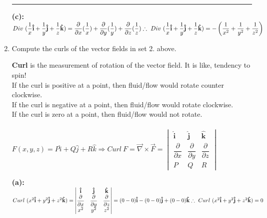 \documentclass[fleqn]{article}
\begin{document}
\begin{enumerate}
      \rule{15cm}{1pt}

      \textcolor{hwColor}{
        \textbf{(c):} \\
        $
          Div ~ (\dfrac{1}{x} \mathbf{\hat{i}}+\dfrac{1}{y} \mathbf{\hat{j}}+\dfrac{1}{z} \mathbf{\hat{k}})=\dfrac{\partial}{\partial x}(\dfrac{1}{x})+\dfrac{\partial}{\partial y}(\dfrac{1}{y})+\dfrac{\partial}{\partial z}(\dfrac{1}{z}) \\ \\
          \therefore ~ Div ~ (\dfrac{1}{x} \mathbf{\hat{i}}+\dfrac{1}{y} \mathbf{\hat{j}}+\dfrac{1}{z} \mathbf{\hat{k}})=-\left(\dfrac{1}{x^2}+\dfrac{1}{y^2}+\dfrac{1}{z^2}\right)
        $
      }
    
    \item Compute the curls of the vector fields in set 2. above.
    
      \textcolor{hwColor}{
        \textbf{Curl} is the measurement of rotation of the vector field. It is like, tendency to spin! \\
        If the curl is positive at a point, then fluid/flow would rotate counter clockwise. \\
        If the curl is negative at a point, then fluid/flow would rotate clockwise. \\
        If the curl is zero at a point, then fluid/flow would not rotate. \\
        \\
        $
          F(x,y,z)=P \hat{i}+Q\hat{j}+R\hat{k} \Rightarrow Curl ~ F=\overrightarrow{\nabla} \times \overrightarrow{F}=\begin{vmatrix}
            \mathbf{\hat{i}} & \mathbf{\hat{j}} & \mathbf{\hat{k}} \\
            \dfrac{\partial}{\partial x} & \dfrac{\partial}{\partial y} & \dfrac{\partial}{\partial z} \\
            P & Q & R
          \end{vmatrix}
        $
      }
    
      \textcolor{hwColor}{
        \textbf{(a):} \\
        $
          Curl ~ (x^2 \mathbf{\hat{i}}+y^2 \mathbf{\hat{j}}+z^2 \mathbf{\hat{k}})
          =\begin{vmatrix}
            \mathbf{\hat{i}} & \mathbf{\hat{j}} & \mathbf{\hat{k}} \\
            \dfrac{\partial}{\partial x} & \dfrac{\partial}{\partial y} & \dfrac{\partial}{\partial z} \\
            x^2 & y^2 & z^2
          \end{vmatrix}=(0-0)\mathbf{\hat{i}}-(0-0)\mathbf{\hat{j}}+(0-0)\mathbf{\hat{k}} \\
          \\
          \therefore ~ Curl ~ (x^2 \mathbf{\hat{i}}+y^2 \mathbf{\hat{j}}+z^2 \mathbf{\hat{k}})=0
        $
      }


\end{enumerate}
\end{document}
